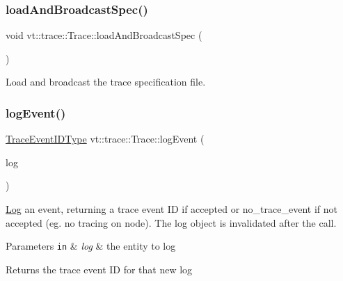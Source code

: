 \subsubsection{\texorpdfstring{load\+And\+Broadcast\+Spec()}{loadAndBroadcastSpec()}}
{\footnotesize\ttfamily void vt\+::trace\+::\+Trace\+::load\+And\+Broadcast\+Spec (\begin{DoxyParamCaption}{ }\end{DoxyParamCaption})}



Load and broadcast the trace specification file. 

\mbox{\label{structvt_1_1trace_1_1_trace_add92bd2da3d78dd7ad2f1112583c4596}} 
\subsubsection{\texorpdfstring{log\+Event()}{logEvent()}}
{\footnotesize\ttfamily \hyperlink{namespacevt_1_1trace_a64a7185f3e102df8d8258f263ccd1582}{Trace\+Event\+I\+D\+Type} vt\+::trace\+::\+Trace\+::log\+Event (\begin{DoxyParamCaption}\item[{\hyperlink{structvt_1_1trace_1_1_trace_a43306d96a91e49db081eaea016f1dd0a}{Log\+Type} \&\&}]{log }\end{DoxyParamCaption})\hspace{0.3cm}{\ttfamily [private]}}



\hyperlink{structvt_1_1trace_1_1_log}{Log} an event, returning a trace event ID if accepted or {\ttfamily no\+\_\+trace\+\_\+event} if not accepted (eg. no tracing on node). The log object is invalidated after the call. 


\begin{DoxyParams}[1]{Parameters}
\mbox{\tt in}  & {\em log} & the entity to log\\
\hline
\end{DoxyParams}
\begin{DoxyReturn}{Returns}
the trace event ID for that new log 
\end{DoxyReturn}
\mbox{\label{structvt_1_1trace_1_1_trace_a5b5091197568d7ed104bb40d68b4ddd7}} 
